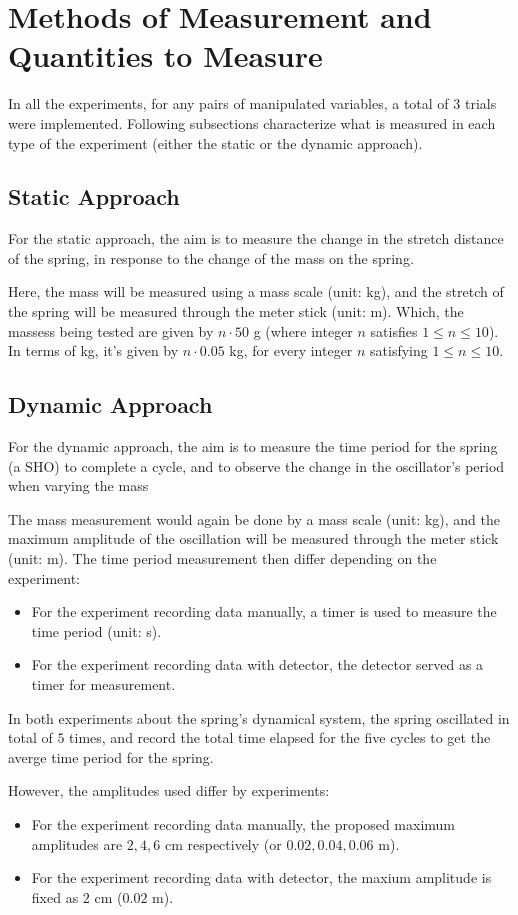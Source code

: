 \documentclass{article}
\begin{document}
\newpage

\section{Methods of Measurement and Quantities to Measure}
In all the experiments, for any pairs of manipulated variables, a total of $3$ trials were implemented. Following subsections characterize what is measured in each type of the experiment (either the static or the dynamic approach).
\subsection{Static Approach}
For the static approach, the aim is to measure the change in the stretch distance of the spring, in response to the change of the mass on the spring.

Here, the mass will be measured using a mass scale (unit: kg), and the stretch of the spring will be measured through the meter stick (unit: m). Which, the massess being tested are given by $n \cdot 50$ g (where integer $n$ satisfies $1\leq n\leq 10$). In terms of kg, it's given by $n \cdot 0.05$ kg, for every integer $n$ satisfying $1\leq n\leq 10$.

\subsection{Dynamic Approach}
For the dynamic approach, the aim is to measure the time period for the spring (a SHO) to complete a cycle, and to observe the change in the oscillator's period when varying the mass 

The mass measurement would again be done by a mass scale (unit: kg), and the maximum amplitude of the oscillation will be measured through the meter stick (unit: m). The time period measurement then differ depending on the experiment:
\begin{itemize}
    \item For the experiment recording data manually, a timer is used to measure the time period (unit: s).
    \item For the experiment recording data with detector, the detector served as a timer for measurement.
\end{itemize}
In both experiments about the spring's dynamical system, the spring oscillated in total of $5$ times, and record the total time elapsed for the five cycles to get the averge time period for the spring.

However, the amplitudes used differ by experiments: 
\begin{itemize}
    \item For the experiment recording data manually, the proposed maximum amplitudes are $2,4,6$ cm respectively (or $0.02,0.04,0.06$ m).
    \item For the experiment recording data with detector, the maxium amplitude is fixed as $2$ cm ($0.02$ m).
\end{itemize}
\end{document}
